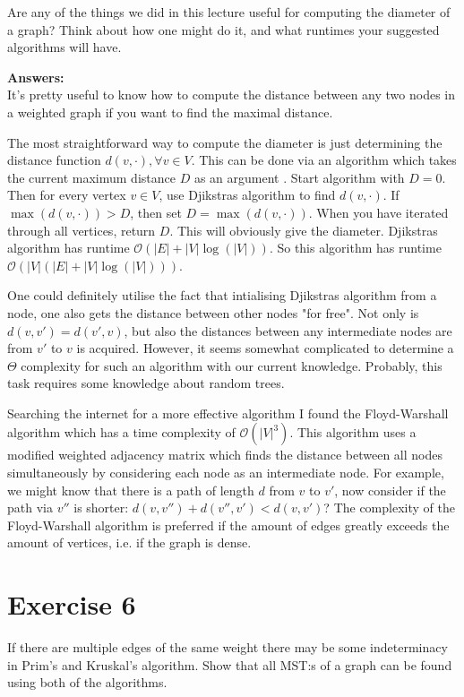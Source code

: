 \documentclass[nobib]{tufte-handout}
\begin{document}
Are any of the things we did in this lecture useful for computing the diameter of a graph? Think about how one might do it, and what runtimes your suggested algorithms will have.

\textbf{Answers:}\\

It's pretty useful to know how to compute the distance between any two nodes in a weighted graph if you want to find the maximal distance. 

The most straightforward way to compute the diameter is just determining the distance function  \( d(v, \cdot), \forall v \in V \). This can be done via an algorithm which takes the current maximum distance  \( D \) as an argument . Start algorithm with \( D=0 \). Then for every vertex \( v\in V \), use Djikstras algorithm to find \( d(v,\cdot) \). If \( \max(d(v,\cdot))>D\), then set \(  D=\max(d(v,\cdot)) \). When you have iterated through all vertices, return \( D\). This will obviously give the diameter. Djikstras algorithm has runtime \( \mathcal{O}(|E|+|V| \log(|V|)) \). So this algorithm has runtime \( \mathcal{O}(|V|(|E|+|V| \log(|V|))) \). 

One could definitely utilise the fact that intialising Djikstras algorithm from a node, one also gets the distance between other nodes "for free". Not only is \( d(v,v')=d(v',v) \), but also the distances between any intermediate nodes are from \( v' \) to \( v \) is acquired. However, it seems somewhat complicated to determine a \( \Theta \) complexity for such an algorithm with our current knowledge. Probably, this task requires some knowledge about random trees. 

Searching the internet for a more effective algorithm I found the Floyd-Warshall algorithm which has a time complexity of \( \mathcal{O}(|V|^3) \). This algorithm uses a modified weighted adjacency matrix which finds the distance between all nodes simultaneously by considering each node as an intermediate node. For example, we might know that there is a path of length \( d\) from \( v \) to \( v' \), now consider if the path via \( v''\) is shorter: \( d(v,v'')+d(v'',v')<d(v,v') \)? The complexity of the Floyd-Warshall algorithm is preferred if the amount of edges greatly exceeds the amount of vertices, i.e. if the graph is dense. 

\newpage
\section{Exercise 6}
If there are multiple edges of the same weight there may be some indeterminacy in Prim's and Kruskal's algorithm. Show that all MST:s of a graph can be found using both of the algorithms.
\end{document}
